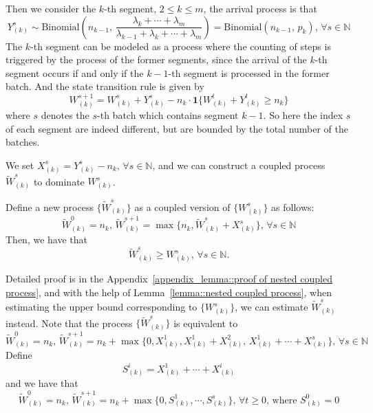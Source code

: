 Then we consider the $k$-th segment, $2\leq k\leq m$, the arrival process is that 
$$Y^s_{(k)} \sim \text{Binomial}\left(  n_{k-1} ,\, \frac{\lambda_{k}+\cdots+\lambda_m }{\lambda_{k-1}+\lambda_k+\cdots+\lambda_m} \right) = \text{Binomial}( n_{k-1} ,\, p_k),\,\forall s\in \mathbb{N} $$
The $k$-th segment can be modeled as a process where the counting of steps is triggered by the process of the former segments, since the arrival of the $k$-th segment occurs if and only if the $k-1$-th segment is processed in the former batch. And the state transition rule is given by
$$W^{s+1}_{(k)}=W^{s}_{(k)}+Y^s_{(k)} - n_{k}\cdot \mathbf{1}\{ W^{t}_{(k)}+Y^t_{(k)}\geq n_{k}  \}$$
where $s$ denotes the $s$-th batch which contains segment $k-1$. So here the index $s$ of each segment are indeed different, but are bounded by the total number of the batches.

We set $X^s_{(k)} = Y^s_{(k)} - n_{k},\,\forall s\in \mathbb{N} $, and we can construct a coupled process $\tilde{W}^s_{(k)}$ to dominate $W^s_{(k)}$.
\begin{lemma}\label{lemma::nested coupled process}
Define a new process $\{ \tilde{W}^s_{(k)} \}$ as a coupled version of $\{ W^s_{(k)} \}$ as follows:
$$\tilde{W}^0_{(k)} = n_{k},\,\tilde{W}^{s+1}_{(k)}=
\max\{ n_{k},\tilde{W}^{s}_{(k)} + X^s_{(k)}\},\,\forall s\in \mathbb{N} $$
Then, we have that 
$$ \tilde{W}_{(k)}^s \geq W^s_{(k)},\,\forall s\in \mathbb{N} .$$
\end{lemma}
Detailed proof is in the Appendix~\ref{appendix_lemma::proof of nested coupled process}, and with the help of Lemma~\ref{lemma::nested coupled process}, when estimating the upper bound corresponding to $\{W^s_{(k)}\}$, we can estimate $\tilde{W}^s_{(k)}$ instead. Note that the process $\{\tilde{W}^s_{(k)}\}$ is equivalent to
$$\tilde{W}^0_{(k)} = n_{k},\,\tilde{W}^{s+1}_{(k)} =n_{k}+ \max\{ 0, X^1_{(k)},X^1_{(k)}+X^2_{(k)},\, X^1_{(k)}+\cdots+X^s_{(k)} \},\,\forall s\in \mathbb{N} $$
Define 
$$S^i_{(k)} = X^1_{(k)}+\cdots+X^i_{(k)}$$
and we have that
$$\tilde{W}^0_{(k)} = n_{k},\,\tilde{W}^{s+1}_{(k)} =n_{k}+ \max\{ 0, S^1_{(k)} ,\cdots,S^s_{(k)}  \},\,\forall t\geq 0,\,\text{where }S^0_{(k)}=0$$

